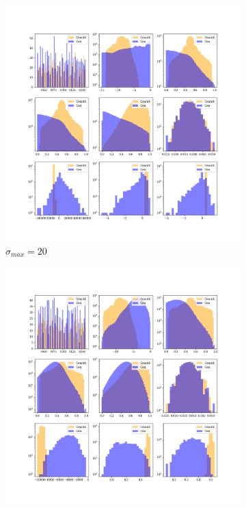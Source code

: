 \begin{figure}
    \centering
    \begin{subfigure}[b]{0.23\textwidth}
        \centering
        \includegraphics[width=\textwidth]{Figures/vp20_1.png}
        \caption{$\sigma_{max}=20$}
        \label{fig:vp20_1}
    \end{subfigure}
    \hfill
    \begin{subfigure}[b]{0.23\textwidth}
        \centering
        \includegraphics[width=\textwidth]{Figures/vp10_1.png}

\end{subfigure}
\end{figure}
